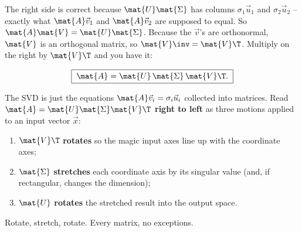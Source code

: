 The right side is correct because $\mat{U}\mat{\Sigma}$ has columns $\sigma_1
\vec{u}_1$ and $\sigma_2 \vec{u}_2$ -- exactly what $\mat{A}\vec{v}_1$ and
$\mat{A}\vec{v}_2$ are supposed to equal. So $\mat{A}\mat{V} = \mat{U}\mat{\Sigma}$.
Because the $\vec{v}$'s are orthonormal, $\mat{V}$ is an orthogonal matrix, so
$\mat{V}\inv = \mat{V}\T$. Multiply on the right by $\mat{V}\T$ and you have it:

\[
  \boxed{\;\mat{A} = \mat{U}\,\mat{\Sigma}\,\mat{V}\T.\;}
\]

\begin{focusbox}
The SVD is just the equations $\mat{A}\vec{v}_i = \sigma_i \vec{u}_i$ collected
into matrices. Read $\mat{A} = \mat{U}\mat{\Sigma}\mat{V}\T$ \textbf{right to
left} as three motions applied to an input vector $\vec{x}$:
\begin{enumerate}
  \item $\mat{V}\T$ \textbf{rotates} so the magic input axes line up with the
        coordinate axes;
  \item $\mat{\Sigma}$ \textbf{stretches} each coordinate axis by its singular
        value (and, if rectangular, changes the dimension);
  \item $\mat{U}$ \textbf{rotates} the stretched result into the output space.
\end{enumerate}
Rotate, stretch, rotate. Every matrix, no exceptions.
\end{focusbox}


